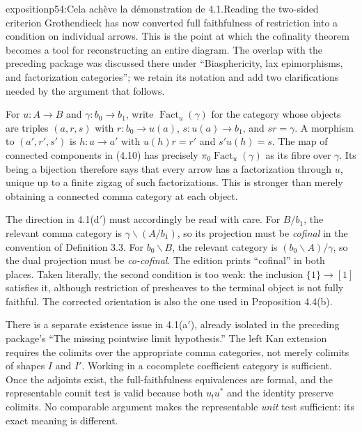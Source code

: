 \begin{dcomment}{exposition}{p54:Cela achève la démonstration de 4.1.}{Reading the two-sided criterion}
Grothendieck has now converted full faithfulness of restriction into a condition on individual arrows. This is the point at which the cofinality theorem becomes a tool for reconstructing an entire diagram. The overlap with the preceding package was discussed there under ``Biasphericity, lax epimorphisms, and factorization categories''; we retain its notation and add two clarifications needed by the argument that follows.

For $u:A\to B$ and $\gamma:b_0\to b_1$, write $\operatorname{Fact}_u(\gamma)$ for the category whose objects are triples $(a,r,s)$ with $r:b_0\to u(a)$, $s:u(a)\to b_1$, and $sr=\gamma$. A morphism to $(a',r',s')$ is $h:a\to a'$ with $u(h)r=r'$ and $s'u(h)=s$. The map of connected components in (4.10) has precisely $\pi_0\operatorname{Fact}_u(\gamma)$ as its fibre over $\gamma$. Its being a bijection therefore says that every arrow has a factorization through $u$, unique up to a finite zigzag of such factorizations. This is stronger than merely obtaining a connected comma category at each object.

The direction in 4.1(d$'$) must accordingly be read with care. For $B/b_1$, the relevant comma category is $\gamma\backslash(A/b_1)$, so its projection must be \emph{cofinal} in the convention of Definition 3.3. For $b_0\backslash B$, the relevant category is $(b_0\backslash A)/\gamma$, so the dual projection must be \emph{co-cofinal}. The edition prints ``cofinal'' in both places. Taken literally, the second condition is too weak: the inclusion $\{1\}\to[1]$ satisfies it, although restriction of presheaves to the terminal object is not fully faithful. The corrected orientation is also the one used in Proposition 4.4(b).

There is a separate existence issue in 4.1(a$'$), already isolated in the preceding package's ``The missing pointwise limit hypothesis.'' The left Kan extension requires the colimits over the appropriate comma categories, not merely colimits of shapes $I$ and $I'$. Working in a cocomplete coefficient category is sufficient. Once the adjoints exist, the full-faithfulness equivalences are formal, and the representable counit test is valid because both $u_!u^*$ and the identity preserve colimits. No comparable argument makes the representable \emph{unit} test sufficient: its exact meaning is different.
\end{dcomment}

